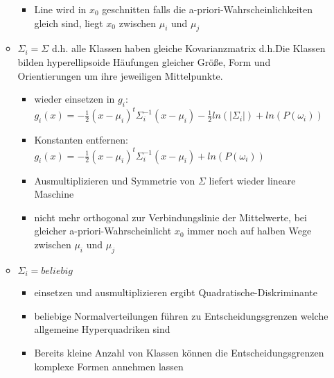 \documentclass{article} %
\begin{document}
\begin{itemize}
\begin{itemize}
\begin{itemize}
				\item Line wird in $x_0$ geschnitten falls die a-priori-Wahrscheinlichkeiten gleich sind, liegt $x_0$ zwischen $\mu_i$ und $\mu_j$
			\end{itemize}
			\item $\Sigma_i = \Sigma$ d.h. alle Klassen haben gleiche Kovarianzmatrix d.h.Die Klassen bilden hyperellipsoide Häufungen gleicher Größe, Form und Orientierungen um ihre jeweiligen Mittelpunkte.
			\begin{itemize}
				\item wieder einsetzen in $g_i$: $g_i(x) = -\frac{1}{2}(x-\mu_i)^t\Sigma_i^{-1}(x-\mu_i)-\frac{1}{2} ln(|\Sigma_i|)+ln(P(\omega_i))$ 
				\item Konstanten entfernen:  $g_i(x) = -\frac{1}{2}(x-\mu_i)^t\Sigma_i^{-1}(x-\mu_i)+ln(P(\omega_i))$
				\item Ausmultiplizieren und Symmetrie von $\Sigma$ liefert wieder lineare Maschine 
				\item nicht mehr orthogonal zur Verbindungslinie der Mittelwerte, bei gleicher a-priori-Wahrscheinlicht $x_0$ immer noch auf halben Wege zwischen $\mu_i$ und $\mu_j$
			\end{itemize}
			\item $\Sigma_i = beliebig$
			\begin{itemize}
				\item einsetzen und ausmultiplizieren ergibt Quadratische-Diskriminante
				\item beliebige Normalverteilungen führen zu Entscheidungsgrenzen welche allgemeine Hyperquadriken sind
				\item Bereits kleine Anzahl von Klassen können die Entscheidungsgrenzen komplexe Formen annehmen lassen
			\end{itemize}
		\end{itemize}
	\end{itemize}
\end{document}
